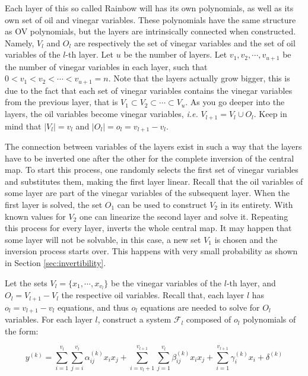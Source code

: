 \documentclass{ufsctex/ufsctex}
\begin{document}
Each layer of this so called Rainbow will has its own polynomials, as well as
its own set of oil and vinegar variables. These polynomials have the same
structure as OV polynomials, but the layers are intrinsically connected when
constructed. Namely, $V_l$ and $O_l$ are respectively the set of vinegar
variables and the set of oil variables of the $l$-th layer. Let $u$ be the
number of layers. Let $v_1, v_2, \cdots, v_{u+1}$ be the number of vinegar
variables in each layer, such that $0 < v_1 < v_2 < \cdots < v_{u+1} = n$. Note
that the layers actually grow bigger, this is due to the fact that each set of
vinegar variables contains the vinegar variables from the previous layer, that
is $V_1 \subset V_2 \subset \cdots \subset V_{u}$. As you go deeper into the
layers, the oil variables become vinegar variables, \textit{i.e.} $V_{l+1} =
V_l \cup O_l$. Keep in mind that $|V_l| = v_l$ and $|O_l| = o_l = v_{l+1} -
v_{l}$.

The connection between variables of the layers exist in such a way that the
layers have to be inverted one after the other for the complete inversion of
the central map. To start this process, one randomly selects the first set of
vinegar variables and substitutes them, making the first layer linear. Recall
that the oil variables of some layer are part of the vinegar variables of the
subsequent layer. When the first layer is solved, the set $O_1$ can be used to
construct $V_2$ in its entirety. With known values for $V_2$ one can linearize
the second layer and solve it. Repeating this process for every layer, inverts
the whole central map. It may happen that some layer will not be solvable, in
this case, a new set $V_1$ is chosen and the inversion process starts over.
This happens with very small probability as shown in Section
\ref{sec:invertibility}.

Let the sets $V_l = \{x_1, \cdots, x_{v_l}\}$ be the vinegar variables of the
$l$-th layer, and $O_l = V_{l+1} - V_l$ the respective oil variables. Recall
that, each layer $l$ has $o_l = v_{l+1} - v_{l}$ equations, and thus $o_l$
equations are needed to solve for $O_l$ variables. For each layer $l$,
construct a system $\mathcal{F}_l$ composed of $o_l$ polynomials of the form:

\begin{equation}\label{eq:rainbowmap}
y^{(k)} =
\sum_{i=1}^{v_l}\sum_{j=i}^{v_l} \alpha^{(k)}_{ij} x_i x_j +
\sum_{i=v_l+1}^{v_{l+1}}\sum_{j=1}^{v_l} \beta^{(k)}_{ij} x_i x_j +
\sum_{i=1}^{v_{l+1}} \gamma^{(k)}_{i} x_i +
\delta^{(k)}
\end{equation}
\end{document}
